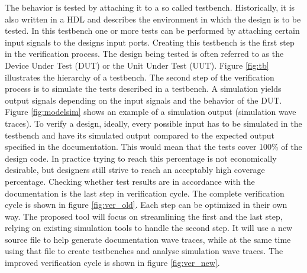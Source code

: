 \nline
The behavior is tested by attaching it to a so called testbench.  Historically, it is also written in a HDL and describes the environment in which the design is to be tested. In this testbench one or more tests can be performed by attaching certain input signals to the designs input ports. Creating this testbench is the first step in the verification process. The design being tested is often referred to as the Device Under Test (DUT) or the Unit Under Test (UUT). Figure \ref{fig:tb} illustrates the hierarchy of a testbench.
\nline
The second step of the verification process is to simulate the tests described in a testbench. A simulation yields output signals depending on the input signals and the behavior of the DUT. Figure \ref{fig:modelsim} shows an example of a simulation output (simulation wave traces).\newpage
{}\nline
To verify a design, ideally,  every possible input has to be simulated in the testbench and have its simulated output compared to the expected output specified in the documentation. This would mean that the tests cover 100\% of the design code. In practice trying to reach this percentage is not economically desirable, but designers still strive to reach an acceptably high coverage percentage. Checking whether test results are in accordance with the documentation is the last step in verification cycle.
\npar
The complete verification cycle is shown in figure \ref{fig:ver_old}.\nline
{}\nline
Each step can be optimized in their own way. The proposed tool will focus on streamlining the first and the last step, relying on existing simulation tools to handle the second step. It will use a new source file to help generate documentation wave traces, while at the same time using that file to create testbenches and analyse simulation wave traces. The improved verification cycle is shown in figure \ref{fig:ver_new}.\nline
{}\nline

